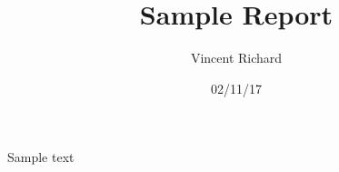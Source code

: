 \documentclass [10 pt, a4 paper]{article}
\title{Sample Report}
\author{Vincent Richard}
\date{02/11/17}
\begin{document}
        Sample text
    
\end{document}
